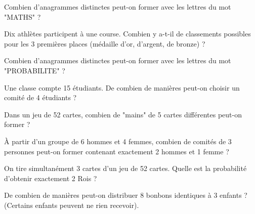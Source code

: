 
\begin{exercicebox}
Combien d'anagrammes distinctes peut-on former avec les lettres du mot "MATHS" ?
\end{exercicebox}

\begin{exercicebox}
Dix athlètes participent à une course. Combien y a-t-il de classements possibles pour les 3 premières places (médaille d'or, d'argent, de bronze) ?
\end{exercicebox}

\begin{exercicebox}
Combien d'anagrammes distinctes peut-on former avec les lettres du mot "PROBABILITE" ?
\end{exercicebox}


\begin{exercicebox}
Une classe compte 15 étudiants. De combien de manières peut-on choisir un comité de 4 étudiants ?
\end{exercicebox}

\begin{exercicebox}
Dans un jeu de 52 cartes, combien de "mains" de 5 cartes différentes peut-on former ?
\end{exercicebox}

\begin{exercicebox}
À partir d'un groupe de 6 hommes et 4 femmes, combien de comités de 3 personnes peut-on former contenant exactement 2 hommes et 1 femme ?
\end{exercicebox}

\begin{exercicebox}
On tire simultanément 3 cartes d'un jeu de 52 cartes. Quelle est la probabilité d'obtenir exactement 2 Rois ?
\end{exercicebox}


\begin{exercicebox}
De combien de manières peut-on distribuer 8 bonbons identiques à 3 enfants ? (Certains enfants peuvent ne rien recevoir).
\end{exercicebox}

